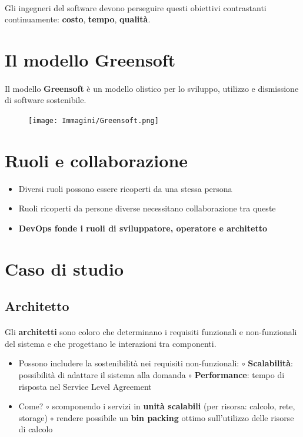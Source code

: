 \documentclass[a4paper, 12pt]{report}
\begin{document}
          \paragraph{}Gli ingegneri del software devono perseguire questi obiettivi contrastanti continuamente: \textbf{costo}, \textbf{tempo}, \textbf{qualità}.
          \section{Il modello Greensoft}
          \paragraph{}Il modello \textbf{Greensoft} è un modello olistico per lo sviluppo, utilizzo e dismissione di software sostenibile.
          \begin{figure}[htbp]
            \centering
            \texttt{[image: Immagini/Greensoft.png]}
          \end{figure}
          \section{Ruoli e collaborazione}
          \begin{itemize}
            \item Diversi ruoli possono essere ricoperti da una stessa persona
            \item Ruoli ricoperti da persone diverse necessitano collaborazione tra queste
            \item \textbf{DevOps fonde i ruoli di sviluppatore, operatore e architetto}
          \end{itemize}
          \section{Caso di studio}
          \subsection{Architetto}
          \paragraph{}Gli \textbf{architetti} sono coloro che determinano i requisiti funzionali e non-funzionali del sistema e che progettano le interazioni tra componenti.
          \begin{itemize}
            \item Possono includere la sostenibilità nei requisiti non-funzionali:
            \subitem $\circ$ \textbf{Scalabilità}: possibilità di adattare il sistema alla domanda
            \subitem $\circ$ \textbf{Performance}: tempo di risposta nel Service Level Agreement
            \item Come?
            \subitem $\circ$ scomponendo i servizi in \textbf{unità scalabili} (per risorsa: calcolo, rete, storage)
            \subitem $\circ$ rendere possibile un \textbf{bin packing} ottimo sull'utilizzo delle risorse di calcolo
          \end{itemize}
\end{document}
